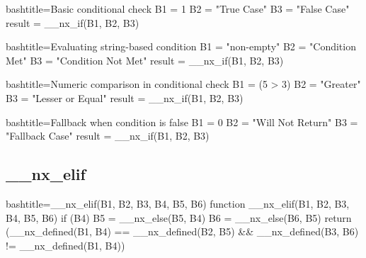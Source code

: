 \begin{NexCodeBox}{bash}{title={Basic conditional check}}
	B1 = 1
	B2 = "True Case"
	B3 = "False Case"
	result = __nx_if(B1, B2, B3)
\end{NexCodeBox}

\begin{NexCodeBox}{bash}{title={Evaluating string-based condition}}
	B1 = "non-empty"
	B2 = "Condition Met"
	B3 = "Condition Not Met"
	result = __nx_if(B1, B2, B3)
\end{NexCodeBox}

\begin{NexCodeBox}{bash}{title={Numeric comparison in conditional check}}
	B1 = (5 > 3)
	B2 = "Greater"
	B3 = "Lesser or Equal"
	result = __nx_if(B1, B2, B3)
\end{NexCodeBox}


\begin{NexCodeBox}{bash}{title={Fallback when condition is false}}
	B1 = 0
	B2 = "Will Not Return"
	B3 = "Fallback Case"
	result = __nx_if(B1, B2, B3)
\end{NexCodeBox}

\newpage
\subsection{__nx_elif}
\label{__nx_elif}
\begin{NexCodeBox}{bash}{title={__nx_elif(B1, B2, B3, B4, B5, B6)}}
function __nx_elif(B1, B2, B3, B4, B5, B6) {
	if (B4) {
		B5 = __nx_else(B5, B4)
		B6 = __nx_else(B6, B5)
	}
	return (__nx_defined(B1, B4) == __nx_defined(B2, B5) && __nx_defined(B3, B6) != __nx_defined(B1, B4))
}
\end{NexCodeBox}

